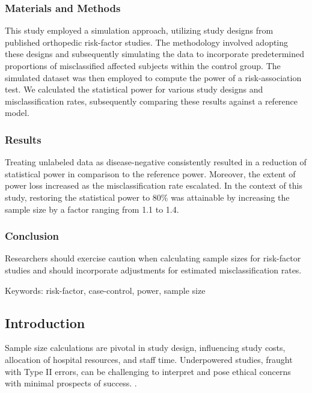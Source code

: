 \documentclass[
]{article}
\begin{document}
\hypertarget{materials-and-methods}{%
\subsubsection{Materials and Methods}\label{materials-and-methods}}

This study employed a simulation approach, utilizing study designs from
published orthopedic risk-factor studies. The methodology involved
adopting these designs and subsequently simulating the data to
incorporate predetermined proportions of misclassified affected subjects
within the control group. The simulated dataset was then employed to
compute the power of a risk-association test. We calculated the
statistical power for various study designs and misclassification rates,
subsequently comparing these results against a reference model.

\hypertarget{results}{%
\subsubsection{Results}\label{results}}

Treating unlabeled data as disease-negative consistently resulted in a
reduction of statistical power in comparison to the reference power.
Moreover, the extent of power loss increased as the misclassification
rate escalated. In the context of this study, restoring the statistical
power to 80\% was attainable by increasing the sample size by a factor
ranging from 1.1 to 1.4.

\hypertarget{conclusion}{%
\subsubsection{Conclusion}\label{conclusion}}

Researchers should exercise caution when calculating sample sizes for
risk-factor studies and should incorporate adjustments for estimated
misclassification rates.

Keywords: risk-factor, case-control, power, sample size

\newpage

\hypertarget{introduction}{%
\subsection{Introduction}\label{introduction}}

Sample size calculations are pivotal in study design, influencing study
costs, allocation of hospital resources, and staff time. Underpowered
studies, fraught with Type II errors, can be challenging to interpret
and pose ethical concerns with minimal prospects of success.
\cite{ halpern2002continuing, hofmeister2007sample}.
\end{document}

